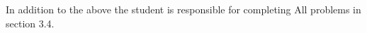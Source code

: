 \documentclass[12pt]{article}
\newenvironment{problem}[2][Problem]{\begin{trivlist}
\item[\hskip \labelsep {\bfseries #1}\hskip \labelsep {\bfseries #2.}]}{\end{trivlist}}
\newenvironment{sol}
    {\emph{Solution:}
    }
    {
    \qed
    }
\begin{document}

\noindent In addition to the above the student is responsible for completing All problems in section 3.4.





\end{document}
